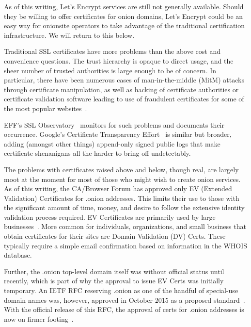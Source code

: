 \documentclass[10pt, conference, compsocconf]{styles/IEEEtran}
\begin{document}
As of this writing, Let's Encrypt services are still not generally available.
Should they be willing to offer certificates for onion
domains, Let's Encrypt could be an easy way for
onionsite operators to take advantage of the traditional certification
infrastructure. We will return to this below.

Traditional SSL certificates have more problems than
the above cost and convenience questions. The trust
hierarchy is opaque to direct usage, and the sheer number of trusted
authorities is large enough to be of concern. In particular, there
have been numerous cases of man-in-the-middle (MitM) attacks through
certificate manipulation, as well as hacking of certificate
authorities or certificate validation software leading to use of
fraudulent certificates for some of the most popular
websites~\cite{forged-ssl-oakland14}.


EFF's SSL Observatory~\cite{ssl-observatory} 
monitors for such problems and documents their occurrence.
Google's Certificate Transparency
Effort~\cite{certificate-transparency} is similar but broader,
adding (amongst other things) append-only signed public
logs that make certificate shenanigans all the harder to bring off
undetectably.

The problems with certificates raised above and below, though real,
are largely moot at the moment for most of those who might wish
to create onion services. As of this writing,
the CA/Browser Forum has approved only EV (Extended Validation)
Certificates for .onion addresses. This limits their use to those with
the significant amount of time, money, and desire to follow the
extensive identity validation process required.  EV Certificates are
primarily used by large businesses~\cite{wikipedia-ev}. More common
for individuals, organizations, and small business that obtain
certificates for their sites are Domain Validation (DV) Certs. These
typically require a simple email confirmation based on information in
the WHOIS database.  

Further, the .onion top-level domain itself was without official status until
recently, which is part of why the approval to issue EV Certs was initially
temporary. An IETF RFC reserving .onion as one of the handful of
special-use domain names was, however, approved in October 2015 as a
proposed standard~\cite{ietf-onion-tld-rfc}.  With the official
release of this RFC, the approval of certs for .onion addresses is now
on firmer footing~\cite{7686-and-all}. 
\end{document}

